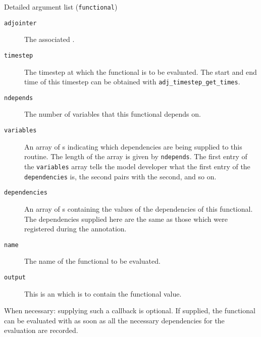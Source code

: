 \begin{boxwithtitle}{Detailed argument list (\texttt{functional})}
\begin{description}
\item[\texttt{adjointer}] The associated .
\item[\texttt{timestep}] The timestep at which the functional is to be evaluated. The start and end time of this timestep can be obtained with \texttt{adj_timestep_get_times}.
\item[\texttt{ndepends}] The number of variables that this functional depends on.
\item[\texttt{variables}] An array of s indicating which dependencies are being supplied to this routine. The length of the
array is given by \texttt{ndepends}. The first entry of the \texttt{variables} array
tells the model developer what the first entry of the \texttt{dependencies} is, the second pairs with the second, and so on.
\item[\texttt{dependencies}] An array of s containing the values of the dependencies of this functional. The dependencies supplied
here are the same as those which were registered during the annotation.
\item[\texttt{name}] The name of the functional to be evaluated.
\item[\texttt{output}] This is an  which is to contain the functional value. 
\end{description}
\end{boxwithtitle}

When necessary: supplying such a callback is optional. 
If supplied, the functional can be evaluated with  as soon as all the necessary dependencies for the evaluation are recorded. 
